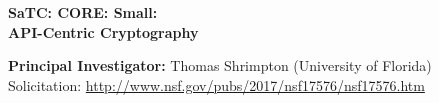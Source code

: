 \documentclass[10pt]{article}
\newcommand{\mytitle}{SaTC: CORE: Small:\\
  \smallskip API-Centric Cryptography}
\begin{document}
\vspace*{1.0in}
\begin{center}

{\Large\bf \mytitle}

\vspace*{.5in}

\medskip
\noindent\textbf{Principal Investigator:} Thomas Shrimpton (University of Florida)\\


\medskip
Solicitation: \url{http://www.nsf.gov/pubs/2017/nsf17576/nsf17576.htm}

\end{center}
\thispagestyle{empty}

\iffalse

\clearpage
\setcounter{page}{1}


\fi

\clearpage
\renewcommand{\thepage}{D-\arabic{page}}
\setcounter{page}{1}










%





%

\clearpage
\renewcommand{\thepage}{M-\arabic{page}}
\setcounter{page}{1}

\end{document}
